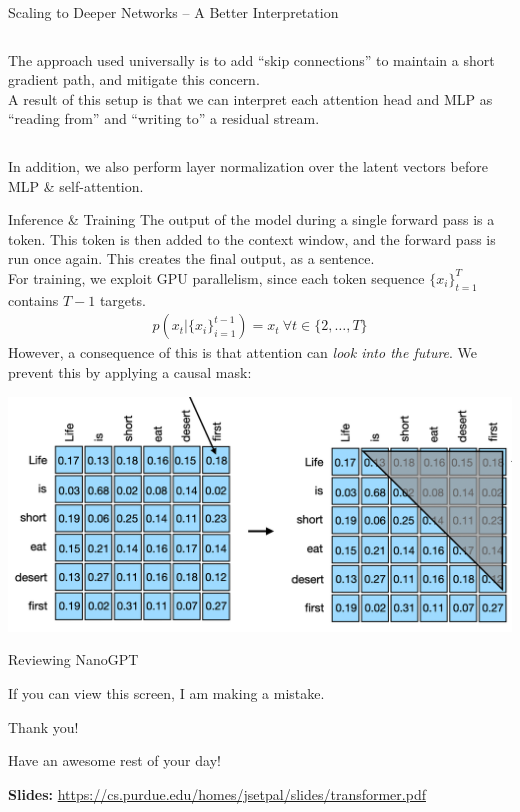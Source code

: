 \documentclass{beamer}
\begin{document}
\begin{frame}{Scaling to Deeper Networks -- A Better Interpretation}
\begin{columns}
\begin{column}{.5\textwidth}
			The approach used universally is to add ``skip connections'' to maintain a short gradient path, and mitigate this concern. \pause \newline \\

			A result of this setup is that we can interpret each attention head and MLP as ``reading from'' and ``writing to'' a residual stream. \pause
		\end{column}
	\end{columns}
	\vspace{1em}
	In addition, we also perform layer normalization over the latent vectors before MLP \& self-attention.
\end{frame}

\begin{frame}{Inference \& Training}
	The output of the model during a single forward pass is a token. \pause This token is then added to the context window, and the forward pass is run once again. This creates the final output, as a sentence. \pause \newline \\

	For training, we exploit GPU parallelism, since each token sequence $\{x_i\}^T_{t=1}$ contains $T-1$ targets.
	\begin{gather}
		p\left(x_t | \{x_i\}^{t-1}_{i=1}\right) = x_t\ \forall t \in \{2, \ldots, T\}
	\end{gather} \pause
	However, a consequence of this is that attention can \textit{look into the future}. \pause We prevent this by applying a causal mask:

	\begin{center}
		\includegraphics[width=.6\textwidth]{img/causal-mask.png}
	\end{center}
\end{frame}

\begin{frame}{Reviewing NanoGPT}
	\begin{center}
		If you can view this screen, I am making a mistake.
	\end{center}
\end{frame}

\begin{frame}{Thank you!}
	\begin{center}
		Have an awesome rest of your day!
	\end{center}
	\begin{center}
		\textbf{Slides:} {\small \url{https://cs.purdue.edu/homes/jsetpal/slides/transformer.pdf}}
	\end{center}
\end{frame}
\end{document}
